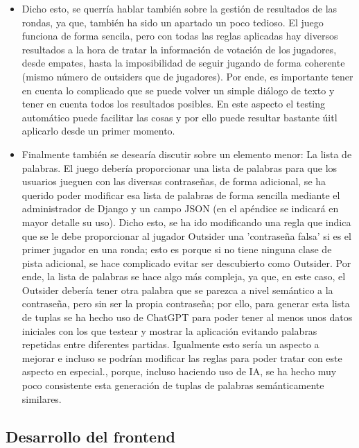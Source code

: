 \begin{itemize}
	\item Dicho esto, se querría hablar también sobre la gestión de resultados de las rondas, ya que, también ha sido un apartado un poco tedioso. El juego funciona de forma sencila, pero con todas las reglas aplicadas
		  hay diversos resultados a la hora de tratar la información de votación de los jugadores, desde empates, hasta la imposibilidad de seguir jugando de forma coherente (mismo número de outsiders que de jugadores).
		  Por ende, es importante tener en cuenta lo complicado que se puede volver un simple diálogo de texto y tener en cuenta todos los resultados posibles. En este aspecto el testing automático puede facilitar las
		  cosas y por ello puede resultar bastante úitl aplicarlo desde un primer momento.

	\item Finalmente también se desearía discutir sobre un elemento menor: La lista de palabras. El juego debería proporcionar una lista de palabras para que los usuarios jueguen con las 
		  diversas contraseñas, de forma adicional, se ha querido poder modificar esa lista de palabras de forma sencilla mediante el administrador de Django y un campo JSON (en el apéndice se indicará en mayor detalle su uso).
		  Dicho esto, se ha ido modificando una regla que indica que se le debe proporcionar al jugador Outsider una 'contraseña falsa' si es el primer jugador en una ronda; esto es porque si 
		  no tiene ninguna clase de pista adicional, se hace complicado evitar ser descubierto como Outsider. Por ende, la lista de palabras se hace algo más compleja, ya que, en este caso, el Outsider
		  debería tener otra palabra que se parezca a nivel semántico a la contraseña, pero sin ser la propia contraseña; por ello, para generar esta lista de tuplas se ha hecho uso de ChatGPT \cite{ChatGPT} para
		  poder tener al menos unos datos iniciales con los que testear y mostrar la aplicación evitando palabras repetidas entre diferentes partidas. Igualmente esto sería un aspecto a mejorar e incluso
		  se podrían modificar las reglas para poder tratar con este aspecto en especial., porque, incluso haciendo uso de IA, se ha hecho muy poco consistente esta generación de tuplas de palabras semánticamente similares.
		
\end{itemize}


\subsection{Desarrollo del frontend} \label{Desarrollo del frontend}

